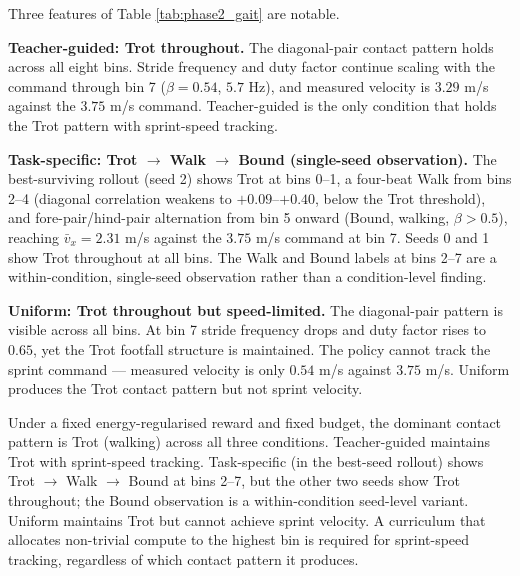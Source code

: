 Three features of Table \ref{tab:phase2_gait} are notable.

\textbf{Teacher-guided: Trot throughout.} The diagonal-pair contact pattern holds across all eight bins. Stride frequency and duty factor continue scaling with the command through bin 7 ($\beta = 0.54$, $5.7$ Hz), and measured velocity is $3.29$ m/s against the $3.75$ m/s command. Teacher-guided is the only condition that holds the Trot pattern with sprint-speed tracking.

\textbf{Task-specific: Trot $\to$ Walk $\to$ Bound (single-seed observation).} The best-surviving rollout (seed 2) shows Trot at bins 0--1, a four-beat Walk from bins 2--4 (diagonal correlation weakens to $+0.09$--$+0.40$, below the Trot threshold), and fore-pair/hind-pair alternation from bin 5 onward (Bound, walking, $\beta > 0.5$), reaching $\bar v_x = 2.31$ m/s against the $3.75$ m/s command at bin 7. Seeds 0 and 1 show Trot throughout at all bins. The Walk and Bound labels at bins 2--7 are a within-condition, single-seed observation rather than a condition-level finding.

\textbf{Uniform: Trot throughout but speed-limited.} The diagonal-pair pattern is visible across all bins. At bin 7 stride frequency drops and duty factor rises to $0.65$, yet the Trot footfall structure is maintained. The policy cannot track the sprint command --- measured velocity is only $0.54$ m/s against $3.75$ m/s. Uniform produces the Trot contact pattern but not sprint velocity.

Under a fixed energy-regularised reward and fixed budget, the dominant contact pattern is Trot (walking) across all three conditions. Teacher-guided maintains Trot with sprint-speed tracking. Task-specific (in the best-seed rollout) shows Trot $\to$ Walk $\to$ Bound at bins 2--7, but the other two seeds show Trot throughout; the Bound observation is a within-condition seed-level variant. Uniform maintains Trot but cannot achieve sprint velocity. A curriculum that allocates non-trivial compute to the highest bin is required for sprint-speed tracking, regardless of which contact pattern it produces.
